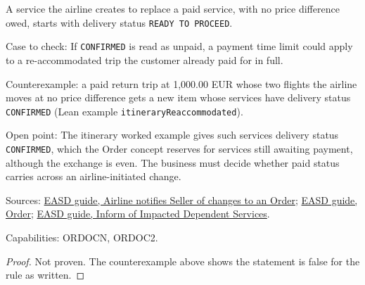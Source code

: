 \begin{theorem}
  \label{thm:airline-change-reaccommodated-paid-status}
  A service the airline creates to replace a paid service, with no price
  difference owed, starts with delivery status \texttt{READY TO PROCEED}.

  Case to check: If \texttt{CONFIRMED} is read as unpaid, a payment time
  limit could apply to a re-accommodated trip the customer already paid for
  in full.

  Counterexample: a paid return trip at 1,000.00 EUR whose two flights the
  airline moves at no price difference gets a new item whose services have
  delivery status \texttt{CONFIRMED} (Lean example
  \texttt{itineraryReaccommodated}).

  Open point: The itinerary worked example gives such services delivery
  status \texttt{CONFIRMED}, which the Order concept reserves for services
  still awaiting payment, although the exchange is even. The business must
  decide whether paid status carries across an airline-initiated change.

  Sources: \href{https://standards.atlassian.net/wiki/spaces/EASD/pages/815202352}{EASD guide, Airline notifies Seller of changes to an Order};
  \href{https://standards.atlassian.net/wiki/spaces/EASD/pages/574849062}{EASD guide, Order};
  \href{https://standards.atlassian.net/wiki/spaces/EASD/pages/672825400}{EASD guide, Inform of Impacted Dependent Services}.

  Capabilities: ORDOCN, ORDOC2.
\end{theorem}
\begin{proof}
  Not proven.  The counterexample above shows the statement is false for the
  rule as written.
\end{proof}

